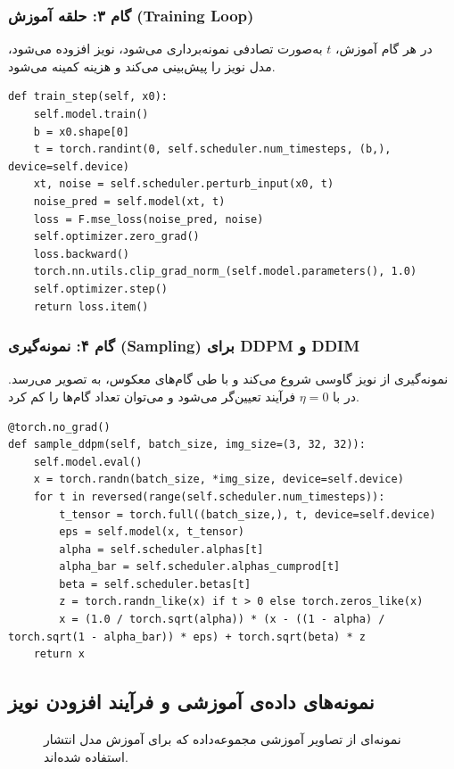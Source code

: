 \subsubsection*{گام ۳: حلقه آموزش (Training Loop)}
در هر گام آموزش، $t$ به‌صورت تصادفی نمونه‌برداری می‌شود، نویز افزوده می‌شود، مدل نویز را پیش‌بینی می‌کند و هزینه  کمینه می‌شود.
\begin{verbatim}
def train_step(self, x0):
    self.model.train()
    b = x0.shape[0]
    t = torch.randint(0, self.scheduler.num_timesteps, (b,), device=self.device)
    xt, noise = self.scheduler.perturb_input(x0, t)
    noise_pred = self.model(xt, t)
    loss = F.mse_loss(noise_pred, noise)
    self.optimizer.zero_grad()
    loss.backward()
    torch.nn.utils.clip_grad_norm_(self.model.parameters(), 1.0)
    self.optimizer.step()
    return loss.item()
\end{verbatim}

\subsubsection*{گام ۴: نمونه‌گیری (Sampling) برای DDPM و DDIM}
نمونه‌گیری  از نویز گاوسی شروع می‌کند و با طی گام‌های معکوس، به تصویر می‌رسد. در  با $\eta=0$ فرآیند تعیین‌گر می‌شود و می‌توان تعداد گام‌ها را کم کرد.
\begin{verbatim}
@torch.no_grad()
def sample_ddpm(self, batch_size, img_size=(3, 32, 32)):
    self.model.eval()
    x = torch.randn(batch_size, *img_size, device=self.device)
    for t in reversed(range(self.scheduler.num_timesteps)):
        t_tensor = torch.full((batch_size,), t, device=self.device)
        eps = self.model(x, t_tensor)
        alpha = self.scheduler.alphas[t]
        alpha_bar = self.scheduler.alphas_cumprod[t]
        beta = self.scheduler.betas[t]
        z = torch.randn_like(x) if t > 0 else torch.zeros_like(x)
        x = (1.0 / torch.sqrt(alpha)) * (x - ((1 - alpha) / torch.sqrt(1 - alpha_bar)) * eps) + torch.sqrt(beta) * z
    return x
\end{verbatim}

\subsection{نمونه‌های داده‌ی آموزشی و فرآیند افزودن نویز}

\begin{figure}[H]
    \centering
    \caption{نمونه‌ای از تصاویر آموزشی مجموعه‌داده  که برای آموزش مدل انتشار استفاده شده‌اند.}
    \label{fig:cifar-train-samples}
\end{figure}

